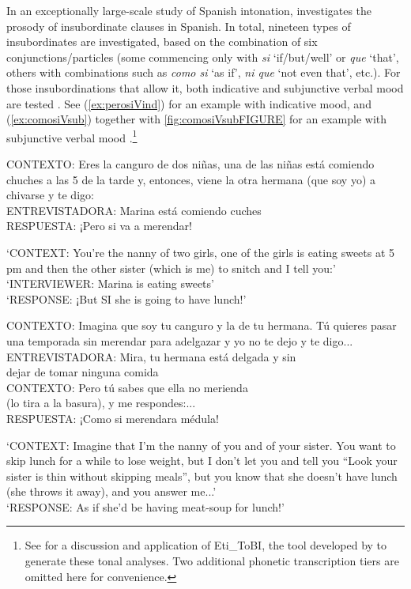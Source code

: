 In an exceptionally large-scale study of Spanish intonation, \citet{ElviraGarcia.2016} investigates the prosody of insubordinate clauses in Spanish. In total, nineteen types of insubordinates are investigated, based on the combination of six conjunctions/particles (some commencing only with \textit{si} `if/but/well' or \textit{que} `that', others with combinations such as \textit{como si} `as if', \textit{ni que} `not even that', etc.). For those insubordinations that allow it, both indicative and subjunctive verbal mood are tested \citep[58]{ElviraGarcia.2016}. See (\ref{ex:perosiVind}) for an example with indicative mood, and (\ref{ex:comosiVsub}) together with \autoref{fig:comosiVsubFIGURE} for an example with subjunctive verbal mood \citep[324--325]{ElviraGarcia.2016}.\footnote{See  for a discussion and application of Eti\_ToBI, the tool developed by \citet{ElviraGarcia.2016,ElviraGarciaRoseanoFernandezPlanas.2016} to generate these tonal analyses. Two additional phonetic transcription tiers are omitted here for convenience.}


\begin{exe}
	\ex  \label{ex:perosiVind}  CONTEXTO: Eres la canguro de dos niñas, una de las niñas está comiendo	chuches a las 5 de la tarde y, entonces, viene la otra hermana (que soy yo) a	chivarse y te digo: \\
	ENTREVISTADORA: Marina está comiendo cuches \\
	RESPUESTA: ¡Pero si va a merendar!
	
	\glt `CONTEXT: You're the nanny of two girls, one of the girls is eating sweets at 5 pm and then the other sister (which is me) to snitch and I tell you:' \\
	`INTERVIEWER: Marina is eating sweets' \\
	`RESPONSE: ¡But SI she is going to have lunch!'

\ex  \label{ex:comosiVsub}  CONTEXTO: Imagina que soy tu canguro y la de tu hermana. Tú quieres pasar
	una temporada sin merendar para adelgazar y yo no te dejo y te digo... \\
	ENTREVISTADORA: Mira, tu hermana está delgada y sin \\ 
	dejar de tomar ninguna comida \\
	CONTEXTO: Pero tú sabes que ella no merienda \\
	(lo tira a la basura), y me respondes:... \\
	RESPUESTA: ¡Como si merendara médula! 
	
	\glt `CONTEXT: Imagine that I'm the nanny of you and of your sister. You want to skip lunch for a while to lose weight, but I don't let you and tell you ``Look your sister is thin without skipping meals'', but you know that she doesn't have lunch (she throws it away), and you answer me...'\\
	`RESPONSE: As if she'd be having meat-soup for lunch!'
\end{exe}


